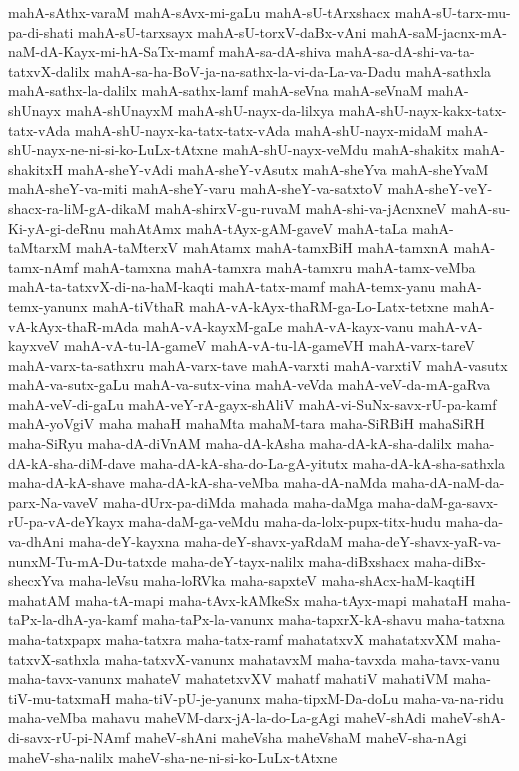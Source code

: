 {mahA-sAthx-varaM
mahA-sAvx-mi-gaLu
mahA-sU-tArxshacx
mahA-sU-tarx-mu-pa-di-shati
mahA-sU-tarxsayx
mahA-sU-torxV-daBx-vAni
mahA-saM-jacnx-mA-naM-dA-Kayx-mi-hA-SaTx-mamf
mahA-sa-dA-shiva
mahA-sa-dA-shi-va-ta-tatxvX-dalilx
mahA-sa-ha-BoV-ja-na-sathx-la-vi-da-La-va-Dadu
mahA-sathxla
mahA-sathx-la-dalilx
mahA-sathx-lamf
mahA-seVna
mahA-seVnaM
mahA-shUnayx
mahA-shUnayxM
mahA-shU-nayx-da-lilxya
mahA-shU-nayx-kakx-tatx-tatx-vAda
mahA-shU-nayx-ka-tatx-tatx-vAda
mahA-shU-nayx-midaM
mahA-shU-nayx-ne-ni-si-ko-LuLx-tAtxne
mahA-shU-nayx-veMdu
mahA-shakitx
mahA-shakitxH
mahA-sheY-vAdi
mahA-sheY-vAsutx
mahA-sheYva
mahA-sheYvaM
mahA-sheY-va-miti
mahA-sheY-varu
mahA-sheY-va-satxtoV
mahA-sheY-veY-shacx-ra-liM-gA-dikaM
mahA-shirxV-gu-ruvaM
mahA-shi-va-jAcnxneV
mahA-su-Ki-yA-gi-deRnu
mahAtAmx
mahA-tAyx-gAM-gaveV
mahA-taLa
mahA-taMtarxM
mahA-taMterxV
mahAtamx
mahA-tamxBiH
mahA-tamxnA
mahA-tamx-nAmf
mahA-tamxna
mahA-tamxra
mahA-tamxru
mahA-tamx-veMba
mahA-ta-tatxvX-di-na-haM-kaqti
mahA-tatx-mamf
mahA-temx-yanu
mahA-temx-yanunx
mahA-tiVthaR
mahA-vA-kAyx-thaRM-ga-Lo-Latx-tetxne
mahA-vA-kAyx-thaR-mAda
mahA-vA-kayxM-gaLe
mahA-vA-kayx-vanu
mahA-vA-kayxveV
mahA-vA-tu-lA-gameV
mahA-vA-tu-lA-gameVH
mahA-varx-tareV
mahA-varx-ta-sathxru
mahA-varx-tave
mahA-varxti
mahA-varxtiV
mahA-vasutx
mahA-va-sutx-gaLu
mahA-va-sutx-vina
mahA-veVda
mahA-veV-da-mA-gaRva
mahA-veV-di-gaLu
mahA-veY-rA-gayx-shAliV
mahA-vi-SuNx-savx-rU-pa-kamf
mahA-yoVgiV
maha
mahaH
mahaMta
mahaM-tara
maha-SiRBiH
mahaSiRH
maha-SiRyu
maha-dA-diVnAM
maha-dA-kAsha
maha-dA-kA-sha-dalilx
maha-dA-kA-sha-diM-dave
maha-dA-kA-sha-do-La-gA-yitutx
maha-dA-kA-sha-sathxla
maha-dA-kA-shave
maha-dA-kA-sha-veMba
maha-dA-naMda
maha-dA-naM-da-parx-Na-vaveV
maha-dUrx-pa-diMda
mahada
maha-daMga
maha-daM-ga-savx-rU-pa-vA-deYkayx
maha-daM-ga-veMdu
maha-da-lolx-pupx-titx-hudu
maha-da-va-dhAni
maha-deY-kayxna
maha-deY-shavx-yaRdaM
maha-deY-shavx-yaR-va-nunxM-Tu-mA-Du-tatxde
maha-deY-tayx-nalilx
maha-diBxshacx
maha-diBx-shecxYva
maha-leVsu
maha-loRVka
maha-sapxteV
maha-shAcx-haM-kaqtiH
mahatAM
maha-tA-mapi
maha-tAvx-kAMkeSx
maha-tAyx-mapi
mahataH
maha-taPx-la-dhA-ya-kamf
maha-taPx-la-vanunx
maha-tapxrX-kA-shavu
maha-tatxna
maha-tatxpapx
maha-tatxra
maha-tatx-ramf
mahatatxvX
mahatatxvXM
maha-tatxvX-sathxla
maha-tatxvX-vanunx
mahatavxM
maha-tavxda
maha-tavx-vanu
maha-tavx-vanunx
mahateV
mahatetxvXV
mahatf
mahatiV
mahatiVM
maha-tiV-mu-tatxmaH
maha-tiV-pU-je-yanunx
maha-tipxM-Da-doLu
maha-va-na-ridu
maha-veMba
mahavu
maheVM-darx-jA-la-do-La-gAgi
maheV-shAdi
maheV-shA-di-savx-rU-pi-NAmf
maheV-shAni
maheVsha
maheVshaM
maheV-sha-nAgi
maheV-sha-nalilx
maheV-sha-ne-ni-si-ko-LuLx-tAtxne
}
